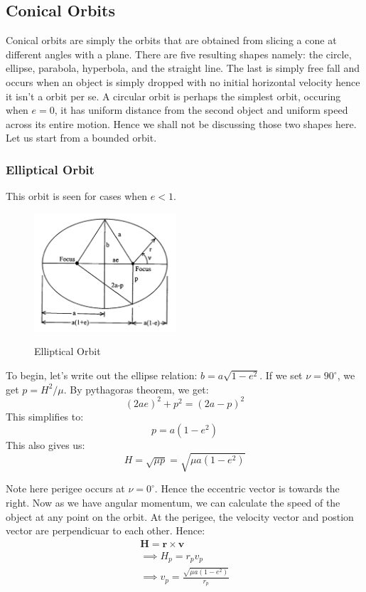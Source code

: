 \documentclass[12pt, letterpaper]{article}
\begin{document}
\subsection{Conical Orbits}

Conical orbits are simply the orbits that are obtained from slicing a cone at different angles with a plane. There are five resulting shapes namely: the circle, ellipse, parabola, hyperbola, and the straight line. The last is simply free fall and occurs when an object is simply dropped with no initial horizontal velocity hence it isn't a orbit per se. A circular orbit is perhaps the simplest orbit, occuring when $e=0$, it has uniform distance from the second object and uniform speed across its entire motion. Hence we shall not be discussing those two shapes here. Let us start from a bounded orbit.

\subsubsection{Elliptical Orbit}

This orbit is seen for cases when $e<1$. 

\begin{figure}[ht]
	\centering
    \includegraphics[width = 200px]{ellipse}
    \label{fig:ellipse}
    \caption{Elliptical Orbit}
\end{figure}

To begin, let's write out the ellipse relation: $b = a\sqrt{1-e^2}$. If we set $\nu = 90^\circ$, we get $p = H^2/\mu$. By pythagoras theorem, we get:
\[
	(2ae)^2 + p^2 = (2a -p)^2
\] 
This simplifies to:
\[p=a(1-e^2)\]
This also gives us:
\[H = \sqrt{\mu p} = \sqrt{\mu a(1-e^2)}\]

Note here perigee occurs at $\nu = 0^\circ$. Hence the eccentric vector is towards the right. Now as we have angular momentum, we can calculate the speed of the object at any point on the orbit. At the perigee, the velocity vector and postion vector are perpendicuar to each other. Hence:
\begin{gather*}
	\mathbf{H} = \mathbf{r\times v}\\
	\implies H_p = r_pv_p\\
	\implies v_p = \frac{\sqrt{\mu a(1-e^2)}}{r_p}
\end{gather*}
\end{document}
